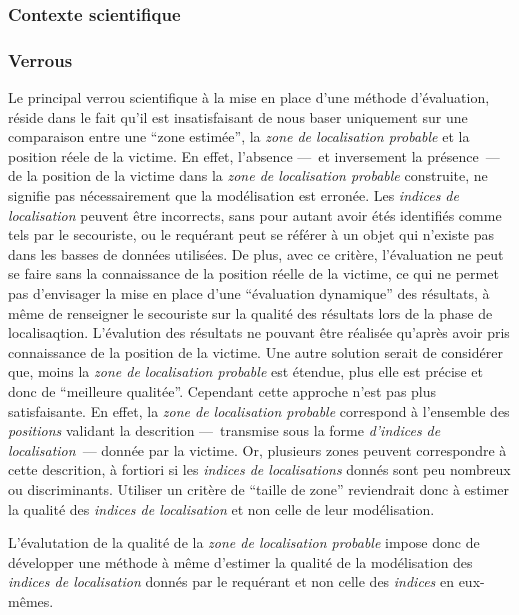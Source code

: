 \subsubsection{Contexte scientifique}

\subsubsection{Verrous}

Le principal verrou scientifique à la mise en place d'une méthode
d'évaluation, réside dans le fait qu'il est insatisfaisant de nous
baser uniquement sur une comparaison entre une \enquote{zone estimée},
\ie la \emph{zone de localisation probable} et la position réele de la
victime. En effet, l'absence ---~et inversement la présence~--- de la
position de la victime dans la \emph{zone de localisation probable}
construite, ne signifie pas nécessairement que la modélisation est
erronée. Les \emph{indices de localisation} peuvent être incorrects,
sans pour autant avoir étés identifiés comme tels par le secouriste,
ou le requérant peut se référer à un objet qui n'existe pas dans les
basses de données utilisées. De plus, avec ce critère, l'évaluation ne
peut se faire sans la connaissance de la position réelle de la
victime, ce qui ne permet pas d'envisager la mise en place d'une
\enquote{évaluation dynamique} des résultats, à même de renseigner le
secouriste sur la qualité des résultats lors de la phase de
localisaqtion. L'évalution des résultats ne pouvant être réalisée
qu'après avoir pris connaissance de la position de la victime. Une
autre solution serait de considérer que, moins la \emph{zone de
  localisation probable} est étendue, plus elle est précise et donc de
\enquote{meilleure qualitée}. Cependant cette approche n'est pas plus
satisfaisante.  En effet, la \emph{zone de localisation probable}
correspond à l'ensemble des \emph{positions} validant la descrition
---~transmise sous la forme \emph{d'indices de localisation}~---
donnée par la victime. Or, plusieurs zones peuvent correspondre à
cette descrition, à fortiori si les \emph{indices de localisations}
donnés sont peu nombreux ou discriminants. Utiliser un critère de
\enquote{taille de zone} reviendrait donc à estimer la qualité des
\emph{indices de localisation} et non celle de leur modélisation.

L'évalutation de la qualité de la \emph{zone de localisation probable}
impose donc de développer une méthode à même d'estimer la qualité de
la modélisation des \emph{indices de localisation} donnés par le
requérant et non celle des \emph{indices} en eux-mêmes.

